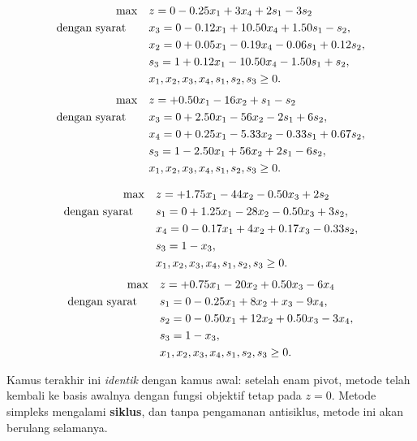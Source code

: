 \[
\begin{aligned}
\max \quad & z = 0 - 0.25x_1 + 3x_4 + 2s_1 - 3s_2 \\
\mbox{dengan syarat}\quad \quad 
& x_3 = 0 - 0.12x_1 + 10.50x_4 + 1.50s_1 - s_2, \\
& x_2 = 0 + 0.05x_1 - 0.19x_4 - 0.06s_1 + 0.12s_2, \\
& s_3 = 1 + 0.12x_1 - 10.50x_4 - 1.50s_1 + s_2, \\
& x_1, x_2, x_3, x_4, s_1, s_2, s_3 \geq 0.
\end{aligned}
\]
\[
\begin{aligned}
\max \quad & z = +0.50x_1 - 16x_2 + s_1 - s_2 \\
\mbox{dengan syarat}\quad \quad 
& x_3 = 0 + 2.50x_1 - 56x_2 - 2s_1 + 6s_2, \\
& x_4 = 0 + 0.25x_1 - 5.33x_2 - 0.33s_1 + 0.67s_2, \\
& s_3 = 1 - 2.50x_1 + 56x_2 + 2s_1 - 6s_2, \\
& x_1, x_2, x_3, x_4, s_1, s_2, s_3 \geq 0.
\end{aligned}
\]

\[
\begin{aligned}
\max \quad & z = +1.75x_1 - 44x_2 - 0.50x_3 + 2s_2 \\
\mbox{dengan syarat}\quad \quad 
& s_1 = 0 + 1.25x_1 - 28x_2 - 0.50x_3 + 3s_2, \\
& x_4 = 0 - 0.17x_1 + 4x_2 + 0.17x_3 - 0.33s_2, \\
& s_3 = 1 - x_3, \\
& x_1, x_2, x_3, x_4, s_1, s_2, s_3 \geq 0.
\end{aligned}
\]
\[
\begin{aligned}
\max \quad & z = +0.75x_1 - 20x_2 + 0.50x_3 - 6x_4 \\
\mbox{dengan syarat}\quad \quad 
& s_1 = 0 - 0.25x_1 + 8x_2 + x_3 - 9x_4, \\
& s_2 = 0 - 0.50x_1 + 12x_2 + 0.50x_3 - 3x_4, \\
& s_3 = 1 - x_3, \\
& x_1, x_2, x_3, x_4, s_1, s_2, s_3 \geq 0.
\end{aligned}
\]

\noindent Kamus terakhir ini \emph{identik} dengan kamus awal: setelah enam pivot, metode telah kembali ke basis awalnya dengan fungsi objektif tetap pada $z=0$. Metode simpleks mengalami \textbf{siklus}, dan tanpa pengamanan antisiklus, metode ini akan berulang selamanya.


